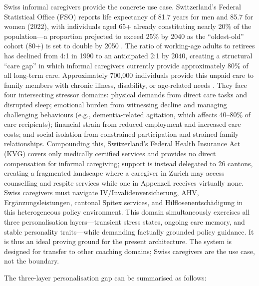 \documentclass[10pt,a4paper]{report}
\begin{document}
Swiss informal caregivers provide the concrete use case. Switzerland's Federal Statistical Office (FSO) reports life expectancy of 81.7 years for men and 85.7 for women (2022), with individuals aged 65+ already constituting nearly 20\% of the population---a proportion projected to exceed 25\% by 2040 as the ``oldest-old'' cohort (80+) is set to double by 2050 \citep{FSO2023}. The ratio of working-age adults to retirees has declined from 4:1 in 1990 to an anticipated 2:1 by 2040, creating a structural ``care gap'' in which informal caregivers currently provide approximately 80\% of all long-term care. Approximately 700,000 individuals provide this unpaid care to family members with chronic illness, disability, or age-related needs \citep{OECD2023, ZHAW2022}. They face four intersecting stressor domains: physical demands from direct care tasks and disrupted sleep; emotional burden from witnessing decline and managing challenging behaviours (e.g., dementia-related agitation, which affects 40--80\% of care recipients); financial strain from reduced employment and increased care costs; and social isolation from constrained participation and strained family relationships. Compounding this, Switzerland's Federal Health Insurance Act (KVG) covers only medically certified services and provides no direct compensation for informal caregiving; support is instead delegated to 26 cantons, creating a fragmented landscape where a caregiver in Zurich may access counselling and respite services while one in Appenzell receives virtually none. Swiss caregivers must navigate IV/Invalidenversicherung, AHV, Ergänzungsleistungen, cantonal Spitex services, and Hilflosenentschädigung in this heterogeneous policy environment. This domain simultaneously exercises all three personalisation layers---transient stress states, ongoing care memory, and stable personality traits---while demanding factually grounded policy guidance. It is thus an ideal proving ground for the present architecture. The system is designed for transfer to other coaching domains; Swiss caregivers are the use case, not the boundary.

The three-layer personalisation gap can be summarised as follows:
\end{document}
